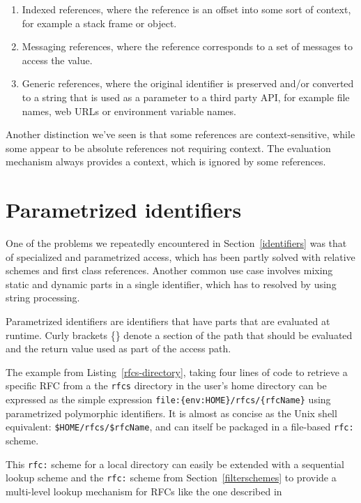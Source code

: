 \documentclass[preprint]{sigplanconf}
\begin{document}
\begin{enumerate}
\item Indexed references, where the reference is an offset into some sort of context, for
	example a stack frame or object.
\item Messaging references, where the reference corresponds to a set of messages to
	access the value.
\item Generic references, where the original identifier is preserved and/or converted to
	a string that is used as a parameter to a third party API, for example file names,
	web URLs or environment variable names.
\end{enumerate}

Another distinction we've seen is that some references are context-sensitive, while some
appear to be absolute references not requiring context.  The evaluation mechanism always
provides a context, which is ignored by some references.  


\section{Parametrized identifiers}
\label{parametrized}

One of the problems we repeatedly encountered in Section~\ref{identifiers} was 
that of specialized and parametrized access, which has been partly solved with
relative schemes and first class references.  Another common use case involves
mixing static and dynamic parts in a single identifier, which has to resolved by
using string processing.

Parametrized identifiers are identifiers that have parts that are evaluated
at runtime.  Curly brackets \{\} denote a section of the path that should be evaluated and
the return value used as part of the access path.

The example from Listing~\ref{rfcs-directory}, taking four lines of code to retrieve a specific RFC from a 
the {\tt rfcs} directory in the user's home directory can be expressed as the simple expression
{\tt file:\{env:HOME\}/rfcs/\{rfcName\}} using parametrized polymorphic identifiers.  It is almost
as concise as the Unix shell equivalent: {\tt \$HOME/rfcs/\$rfcName}, and can itself be packaged
in a file-based {\tt rfc:} scheme. 

This {\tt rfc:} scheme for a local directory can easily be extended with a sequential lookup scheme
and the {\tt rfc:} scheme from Section~\ref{filterschemes} to provide a multi-level lookup mechanism
for RFCs like the one described in 
\end{document}
